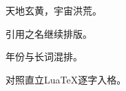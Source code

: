 \documentclass{ltc-cn-vbook}
\begin{document}
\begin{正文}
天地玄黄，宇宙洪荒。

引用之名继续排版。

年份与长词混排。

对照直立LuaTeX逐字入格。
\end{正文}
\end{document}
